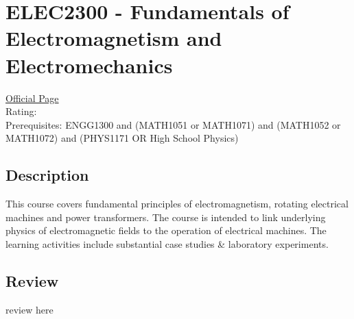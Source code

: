 \hypertarget{ELEC2300}{\section{ELEC2300 - Fundamentals of Electromagnetism and Electromechanics}}

\large
\textcolor{turbo_purple}{\href{https://my.uq.edu.au/programs-courses/course.html?course_code=ELEC2300}{Official Page}} \\
Rating: \cstar\cstar\cstar\cstar\ostar \\
Prerequisites: ENGG1300 and (MATH1051 or MATH1071) and (MATH1052 or MATH1072) and (PHYS1171 OR High School Physics)

\normalsize
\subsection*{Description}
This course covers fundamental principles of electromagnetism, rotating electrical machines and power transformers.
The course is intended to link underlying physics of electromagnetic fields to the operation of electrical machines.
The learning activities include substantial case studies \& laboratory experiments.

\subsection*{Review}
review here
